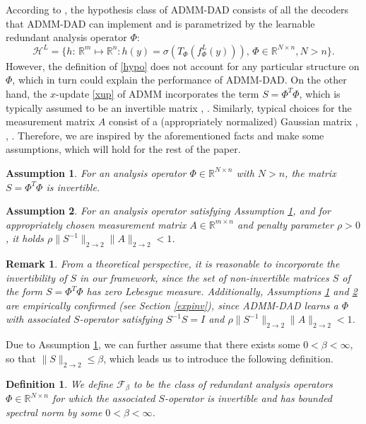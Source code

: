 \documentclass[preprint,12pt]{elsarticle}
\newtheorem{definition}[theorem]{Definition}
\newtheorem{remark}[theorem]{Remark}
\newtheorem{assume}{Assumption}[section]
\newcommand{\Rmn}{\mathbb{R}^{m\times n}}
\newcommand{\RNn}{\mathbb{R}^{N\times n}}
\newcommand{\opnorm}{2\rightarrow2}
\begin{document}
According to \cite{admmdad}, the hypothesis class of ADMM-DAD consists of all the decoders that ADMM-DAD can implement and is parametrized by the learnable redundant analysis operator $\Phi$:
\begin{equation}
    \label{hypo}
    \mathcal{H}^L=\{ h:\,\mathbb{R}^m\mapsto\mathbb{R}^n:h(y)=\sigma(T_\Phi(f^L_{\Phi}(y))),\,\Phi\in\mathbb{R}^{N\times n},N>n\}.
\end{equation}
However, the definition of \eqref{hypo} does not account for any particular structure on $\Phi$, which in turn could explain the performance of ADMM-DAD. On the other hand, the $x$-update \eqref{xup} of ADMM incorporates the term $S=\Phi^T\Phi$, which is typically assumed to be an invertible matrix \cite{boyd:5}, \cite{genlasso}. Similarly, typical choices for the measurement matrix $A$ consist of a (appropriately normalized) Gaussian matrix \cite{rf}, \cite{kr}, \cite{cosparse}. Therefore, we are inspired by the aforementioned facts and make some assumptions, which will hold for the rest of the paper.
\begin{assume}\label{assume1}
    For an analysis operator $\Phi\in\RNn$ with $N>n$, the matrix $S=\Phi^T\Phi$ is invertible.
\end{assume}
\begin{assume}\label{assume2}
    For an analysis operator satisfying Assumption \ref{assume1}, and for appropriately chosen measurement matrix $A\in\Rmn$ and penalty parameter $\rho>0$, it holds $\rho\|S^{-1}\|_{\opnorm}\|A\|_{\opnorm}<1$.
\end{assume}

\begin{remark}
    From a theoretical perspective, it is reasonable to incorporate the invertibility of $S$ in our framework, since the set of non-invertible matrices $S$ of the form $S=\Phi^T\Phi$ has zero Lebesgue measure.
    Additionally, Assumptions \ref{assume1} and \ref{assume2} are empirically confirmed (see Section \ref{expinv}), since ADMM-DAD learns a $\Phi$ with associated $S$-operator satisfying $S^{-1}S=I$ and $\rho\|S^{-1}\|_{\opnorm}\|A\|_{\opnorm}<1$.
\end{remark}

Due to Assumption \ref{assume1}, we can further assume that there exists some $0<\beta<\infty$, so that $\|S\|_{\opnorm}\leq\beta$, which leads us to introduce the following definition.

\begin{definition}\label{frame}
    We define $\mathcal{F}_{\beta }$ to be the class of redundant analysis operators $\Phi\in\RNn$ for which the associated $S$-operator is invertible and has bounded spectral norm by some $0<\beta<\infty$.
\end{definition}
\end{document}
